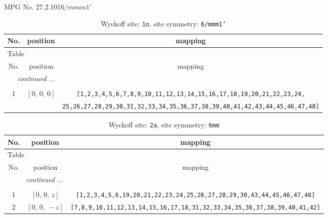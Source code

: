 \documentclass[fleqn,8pt]{jsarticle}
\begin{document}
\setcounter{MaxMatrixCols}{32}

\renewcommand{\tablename}{Table~}
\renewcommand{\figurename}{Figure~}
\begin{center}
\LARGE
MPG No. 27.2.101\quad$6/mmm1'$
\end{center}
\renewcommand{\arraystretch}{1.2}
\begin{longtable}{ccc}
\caption{Wyckoff site: {\tt 1o}, site symmetry: {\tt 6/mmm1'}}
 \\
 \hline \hline
No. & position & mapping \\ \hline \endfirsthead

\multicolumn{2}{l}{\tablename\ \thetable{}} \\
 \hline \hline
No. & position & mapping \\ \hline \endhead

 \hline \hline
\multicolumn{2}{r}{\footnotesize\it continued ...} \\ \endfoot

 \hline \hline
\multicolumn{2}{r}{} \\ \endlastfoot

1 & $\left[ 0,\, 0,\, 0 \right]$ & {\tt [1,2,3,4,5,6,7,8,9,10,11,12,13,14,15,16,17,18,19,20,21,22,23,24,} \\ \hline
 &  & {\tt 25,26,27,28,29,30,31,32,33,34,35,36,37,38,39,40,41,42,43,44,45,46,47,48]} \\
\end{longtable}
\renewcommand{\arraystretch}{1.2}
\begin{longtable}{ccc}
\caption{Wyckoff site: {\tt 2a}, site symmetry: {\tt 6mm}}
 \\
 \hline \hline
No. & position & mapping \\ \hline \endfirsthead

\multicolumn{2}{l}{\tablename\ \thetable{}} \\
 \hline \hline
No. & position & mapping \\ \hline \endhead

 \hline \hline
\multicolumn{2}{r}{\footnotesize\it continued ...} \\ \endfoot

 \hline \hline
\multicolumn{2}{r}{} \\ \endlastfoot

1 & $\left[ 0,\, 0,\, z \right]$ & {\tt [1,2,3,4,5,6,19,20,21,22,23,24,25,26,27,28,29,30,43,44,45,46,47,48]} \\ \hline
2 & $\left[ 0,\, 0,\, - z \right]$ & {\tt [7,8,9,10,11,12,13,14,15,16,17,18,31,32,33,34,35,36,37,38,39,40,41,42]} \\
\end{longtable}
\end{document}
